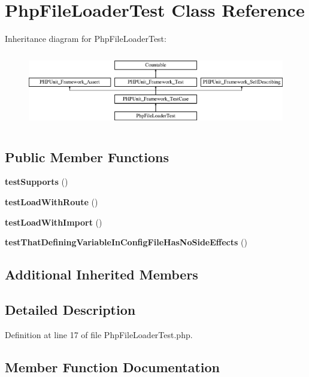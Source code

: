 \section{Php\+File\+Loader\+Test Class Reference}
\label{class_symfony_1_1_component_1_1_routing_1_1_tests_1_1_loader_1_1_php_file_loader_test}
Inheritance diagram for Php\+File\+Loader\+Test\+:\begin{figure}[H]
\begin{center}
\leavevmode
\includegraphics[height=3.303835cm]{class_symfony_1_1_component_1_1_routing_1_1_tests_1_1_loader_1_1_php_file_loader_test}
\end{center}
\end{figure}
\subsection*{Public Member Functions}
\begin{DoxyCompactItemize}
\item 
{\bf test\+Supports} ()
\item 
{\bf test\+Load\+With\+Route} ()
\item 
{\bf test\+Load\+With\+Import} ()
\item 
{\bf test\+That\+Defining\+Variable\+In\+Config\+File\+Has\+No\+Side\+Effects} ()
\end{DoxyCompactItemize}
\subsection*{Additional Inherited Members}


\subsection{Detailed Description}


Definition at line 17 of file Php\+File\+Loader\+Test.\+php.



\subsection{Member Function Documentation}
